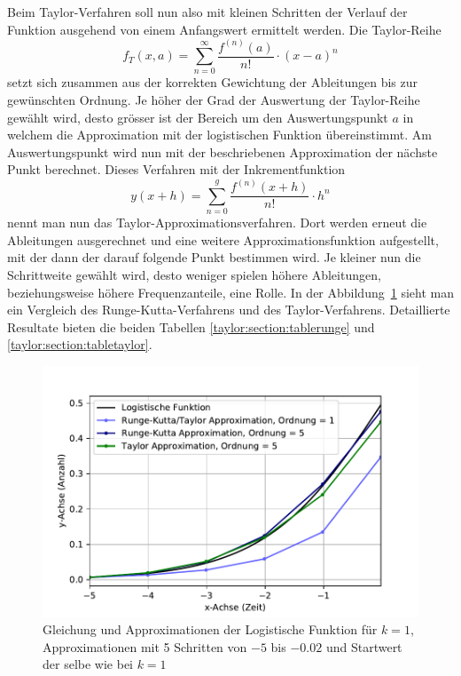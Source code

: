 Beim Taylor-Verfahren soll nun also mit kleinen Schritten der Verlauf der Funktion ausgehend von einem Anfangswert ermittelt werden.
Die Taylor-Reihe
\begin{equation}
f_{T}(x,a)
=
\sum_{n=0}^{\infty}{\frac{f^{(n)}(a)}{n!}}\cdot (x-a)^{n}
\label{taylor:section:taylor}
\end{equation}
setzt sich zusammen aus der korrekten Gewichtung der Ableitungen bis zur gewünschten Ordnung.
Je höher der Grad der Auswertung der Taylor-Reihe gewählt wird, desto grösser ist der Bereich um den Auswertungspunkt $a$ in welchem die Approximation mit der logistischen Funktion übereinstimmt.
Am Auswertungspunkt wird nun mit der beschriebenen Approximation der nächste Punkt berechnet.
Dieses Verfahren mit der Inkrementfunktion
%
%
\begin{equation}
y(x+h)
=
\sum_{n=0}^{g}{\frac{f^{(n)}(x+h)}{n!}}\cdot h^{n}
\label{taylor:section:taylorapproximation}
\end{equation}
nennt man nun das Taylor-Approximationsverfahren.
Dort werden erneut die Ableitungen ausgerechnet und eine weitere Approximationsfunktion aufgestellt, mit der dann der darauf folgende Punkt bestimmen wird.
Je kleiner nun die Schrittweite gewählt wird, desto weniger spielen höhere Ableitungen, beziehungsweise höhere Frequenzanteile, eine Rolle.
In der Abbildung~\ref{taylor:section:fig:LogisticFunctionApproximation} sieht man ein Vergleich des Runge-Kutta-Verfahrens und des Taylor-Verfahrens.
Detaillierte Resultate bieten die beiden Tabellen \ref{taylor:section:tablerunge} und \ref{taylor:section:tabletaylor}.

\begin{figure}
	\begin{center}
	\includegraphics[width=12cm]{papers/taylor/taylorPictures/LogisticFunction.pdf}
	\caption{Gleichung und Approximationen der Logistische Funktion für $k=1$, Approximationen mit 5 Schritten von $-5$ bis $-0.02$ und Startwert der selbe wie bei $k=1$}
	\label{taylor:section:fig:LogisticFunctionApproximation}
	\end{center}
\end{figure}

